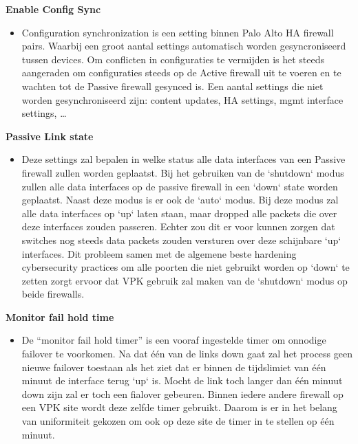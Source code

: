 \textbf{Enable Config Sync}
    \begin{itemize}[label=\textbullet]
        \item Configuration synchronization is een setting binnen Palo Alto HA firewall pairs. Waarbij een groot aantal settings automatisch worden gesyncroniseerd tussen devices. Om conflicten in configuraties te vermijden is het steeds aangeraden om configuraties steeds op de Active firewall uit te voeren en te wachten tot de Passive firewall gesynced is. Een aantal settings die niet worden gesynchroniseerd zijn: content updates, HA settings, mgmt interface settings, \ldots 
    \end{itemize}



\textbf{Passive Link state}
    \begin{itemize}[label=\textbullet]
        \item Deze settings zal bepalen in welke status alle data interfaces van een Passive firewall zullen worden geplaatst. Bij het gebruiken van de `shutdown` modus zullen alle data interfaces op de passive firewall in een `down` state worden geplaatst. Naast deze modus is er ook de `auto` modus. Bij deze modus zal alle data interfaces op `up` laten staan, maar dropped alle packets die over deze interfaces zouden passeren. Echter zou dit er voor kunnen zorgen dat switches nog steeds data packets zouden versturen over deze schijnbare `up` interfaces. Dit probleem samen met de algemene beste hardening cybersecurity practices om alle poorten die niet gebruikt worden op `down` te zetten zorgt ervoor dat VPK gebruik zal maken van de `shutdown` modus op beide firewalls.
    \end{itemize}



\textbf{Monitor fail hold time}
    \begin{itemize}[label=\textbullet]
        \item De ``monitor fail hold timer'' is een vooraf ingestelde timer om onnodige failover te voorkomen. Na dat één van de links down gaat zal het process geen nieuwe failover toestaan als het ziet dat er binnen de tijdslimiet van één minuut de interface terug `up` is. Mocht de link toch langer dan één minuut down zijn zal er toch een fialover gebeuren. Binnen iedere andere firewall op een VPK site wordt deze zelfde timer gebruikt. Daarom is er in het belang van uniformiteit gekozen om ook op deze site de timer in te stellen op één minuut.
    \end{itemize}



